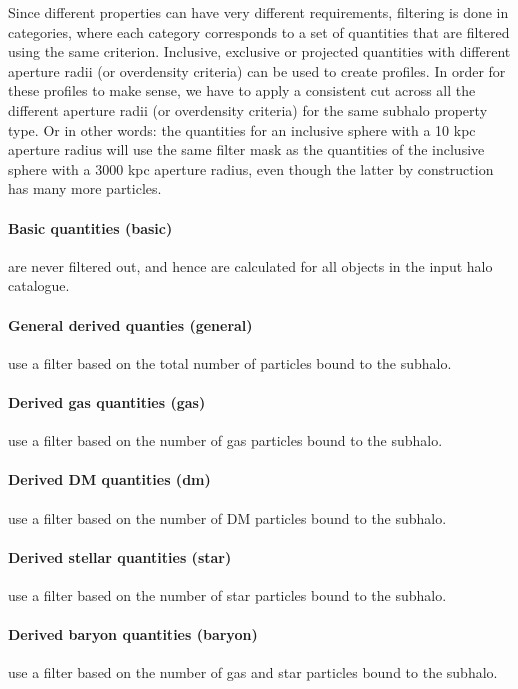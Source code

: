 \documentclass{article}
\begin{document}
Since different properties can have very different requirements, filtering is done in categories, where each 
category corresponds to a set of quantities that are filtered using the same criterion. Inclusive, exclusive 
or projected quantities with different aperture radii (or overdensity criteria) can be used to create 
profiles. In order for these profiles to make sense, we have to apply a consistent cut across all the 
different aperture radii (or overdensity criteria) for the same subhalo property type. Or in other words: the 
quantities for an inclusive sphere with a 10 kpc aperture radius will use the same filter mask as the 
quantities of the inclusive sphere with a 3000 kpc aperture radius, even though the latter by construction has 
many more particles.

\paragraph{Basic quantities (basic)} are never filtered out, and hence are calculated for all objects in the
input halo catalogue.

\paragraph{General derived quanties (general)} use a filter based on the total number of particles bound to the 
subhalo.

\paragraph{Derived gas quantities (gas)} use a filter based on the number of gas particles bound to the subhalo. 

\paragraph{Derived DM quantities (dm)} use a filter based on the number of DM particles bound to the subhalo.

\paragraph{Derived stellar quantities (star)} use a filter based on the number of star particles bound to the 
subhalo.

\paragraph{Derived baryon quantities (baryon)} use a filter based on the number of gas and star particles 
bound to the subhalo.
\end{document}
